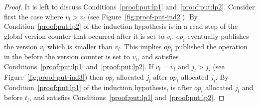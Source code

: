 \begin{proof}
It is left to discuss Conditions~\ref{proof:put:lp1} and~\ref{proof:put:lp2}. Consider first the case where $v_l>v_i$  (see Figure~\ref{fig:proof-put-ind2}). By Condition~\ref{proof:put:lp2} of the induction hypothesis  is in a read step of the global version counter that occurred after it is set to $v_l$. $op_i$ eventually publishes the version $v_i$ which is smaller than $v_l$. This implies $op_i$ published the operation in the  before the version counter is set to $v_l$, and   satisfies Conditions~\ref{proof:put:lp1} and~\ref{proof:put:lp2}. If $v_l =v_i$ and $j_l>j_i$  (see Figure~\ref{fig:proof-put-ind3}) then $op_l$ allocated $j_l$ after $op_i$ allocated $j_i$. By Condition~\ref{proof:put:lp1} of the induction hypothesis,  is after $op_l$ allocated $j_l$  and before $t_l$, and   satisfies Conditions~\ref{proof:put:lp1} and~\ref{proof:put:lp2}. 

\end{proof}

